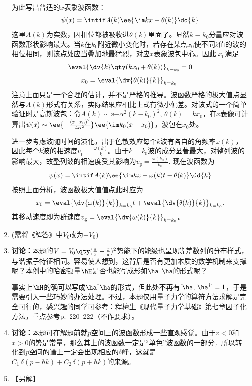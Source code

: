 \begin{enumerate}[label=\textbf{4.\arabic*}, listparindent=\parindent]
为此写出普适的$x$表象波函数：
\[\psi(x) = \intif A(k)\ee{\im k x-\theta(k)}\dd{k}\]
这里$A(k)$为实数，因相位都被吸收进$\theta(k)$里面了。显然$k=k_0$分量应对波函数形状影响最大。当$k$在$k_0$附近微小变化时，若存在某点$x_0$使不同$k$值的波的相位相同，则该点处应当叠加地最猛烈，对应$x$表象波包中心。因此
$x_0$满足\[\eval{\dv{k}\qty(k x_0+\theta(k))}_{k=k_0} = 0\]
\[x_0 = \eval{\dv{\theta(k)}{k}}_{k=k_0}.\]
注意上面只是一个合理的估计，并不是严格的推导。波函数严格的极大值点显然与$A(k)$形式有关系，实际结果应相比上式有微小偏差。对该式的一个简单验证时是高斯波包：令$A(k)\sim \ee{-\alpha^2(k-k_0)^2}$, $\theta(k) = kx_0$，在$x$表像可计算出$\psi(x)\sim \ee{-\frac{(x-x_0)^2}{4\alpha^2}}\ee{\im k_0(x-x_0)}$，波包在$x_0$处。

进一步考虑波随时间的演化，出于色散效应每个$k$波有各自的角频率$\omega(k)$，因此每个$k$波的相速度$v_\mathrm{p}=\frac{\omega(k)}{k}$。由于$k=k_0$波的成分显著最大，对整列波的影响最大，故整列波的相速度受其影响为$v_\mathrm{p}=\frac{\omega(k_0)}{k_0}$. 现在波函数为
\[\psi(x) = \intif A(k)\ee{\im k x-\omega(k)t-\theta(k)}\dd{k}\]
按照上面分析，波函数极大值值点此时应为
\[x_0 =  \eval{\dv{\omega(k)}{k}}_{k=k_0}t +  \eval{\dv{\theta(k)}{k}}_{k=k_0}.\]
其移动速度即为群速度$v_\mathrm{g}=\eval{\dv{\omega(k)}{k}}_{k=k_0}$。

\item
(需将《解答》中$V_0$改为$-V_0$)

\setcounter{enumi}{20}
\item
\noindent\textbf{\color{red}讨论：}本题的$V =V_0\qty(\frac{a}{x}-\frac{x}{a})^2 $势能下的能级也呈现等差数列的分布样式，与谐振子特征相同。容易使人想到，这背后是否有更加本质的数学机制来支撑呢？本例中的哈密顿量$\hH$是否也能写成形如$\ha^\dagger\ha$的形式呢？

事实上$\hH$的确可以写成$\ha^\dagger\ha$的形式，但此处不再有$[\ha,\,\ha^\dagger]=1$，于是需要引入一些巧妙的办法处理。不过，本题仅用量子力学的算符方法求解是完全可行的，感兴趣的同学可参考：程檀生《现代量子力学基础》第七章\;因子化方法，重点参考p.~220--222（不作要求）。

\setcounter{enumi}{22}
\item
\noindent\textbf{\color{red}讨论：}本题可在解题前就$p$空间上的波函数形成一些直观感觉。由于$x<0$和$x>0$的势是常量，那么其上的波函数一定是“单色”波函数的一部分，所以转化到$p$空间的谱上一定会出现相应的$\delta$峰，这就是$C_1\,\delta(p-\hbar k)+C_2\,\delta(p+\hbar k)$的来源。


\setcounter{enumi}{25}
\item 【另解】


\end{enumerate}
